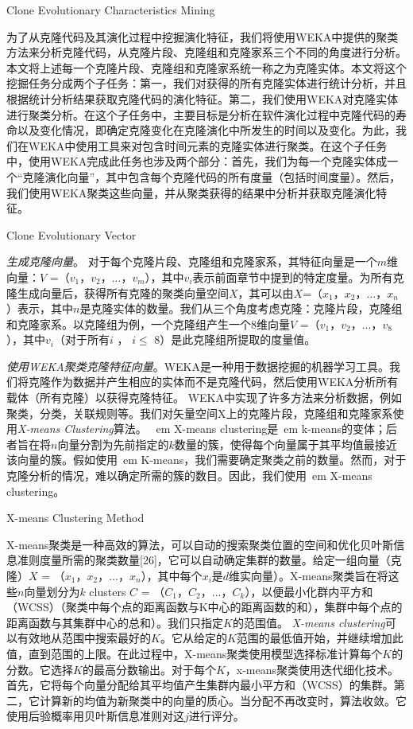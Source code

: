 {Clone Evolutionary Characteristics Mining}

为了从克隆代码及其演化过程中挖掘演化特征，我们将使用WEKA\cite{}中提供的聚类方法来分析克隆代码，从克隆片段、克隆组和克隆家系三个不同的角度进行分析。本文将上述每一个克隆片段、克隆组和克隆家系统一称之为克隆实体。本文将这个挖掘任务分成两个子任务：第一，我们对获得的所有克隆实体进行统计分析，并且根据统计分析结果获取克隆代码的演化特征。第二，我们使用WEKA对克隆实体进行聚类分析。在这个子任务中，主要目标是分析在软件演化过程中克隆代码的寿命以及变化情况，即确定克隆变化在克隆演化中所发生的时间以及变化。为此，我们在WEKA中使用工具来对包含时间元素的克隆实体进行聚类。在这个子任务中，使用WEKA完成此任务也涉及两个部分：首先，我们为每一个克隆实体成一个“克隆演化向量”，其中包含每个克隆代码的所有度量（包括时间度量）。然后，我们使用WEKA聚类这些向量，并从聚类获得的结果中分析并获取克隆演化特征。

{Clone Evolutionary Vector}

 \emph{生成克隆向量}。 对于每个克隆片段、克隆组和克隆家系，其特征向量是一个$m$维向量：{$V$ ={（$v_1$，$v_2$，$...$，$v_m$）}}，其中$v_i$表示前面章节中提到的特定度量。为所有克隆生成向量后，获得所有克隆的聚类向量空间$X$，其可以由{$X$={（$x_1$，$x_2$，$...$，$x_n$）}}表示，其中$n$是克隆实体的数量。我们从三个角度考虑克隆：克隆片段，克隆组和克隆家系。以克隆组为例，一个克隆组产生一个8维向量{$V$ =（$v_1$，$v_2$，$...$，$v_8$）}，其中$v_i$（对于所有$i$ ， $i \leq $ 8）是此克隆组所提取的度量值。
  
 \emph{ 使用WEKA聚类克隆特征向量}。WEKA是一种用于数据挖掘的机器学习工具。我们将克隆作为数据并产生相应的实体而不是克隆代码，然后使用WEKA分析所有载体（所有克隆）以获得克隆特征。 WEKA中实现了许多方法来分析数据，例如聚类，分类，关联规则等。我们对矢量空间X上的克隆片段，克隆组和克隆家系使用{\em X-means Clustering}算法。 {\ em X-means clustering}是{\ em k-means}的变体；后者旨在将$ n $向量分割为先前指定的$ k $数量的簇，使得每个向量属于其平均值最接近该向量的簇。假如使用{\ em K-means}，我们需要确定聚类之前的数量。然而，对于克隆分析的情况，难以确定所需的簇的数目。因此，我们使用{\ em X-means clustering}。

{X-means Clustering Method}

X-means聚类是一种高效的算法，可以自动的搜索聚类位置的空间和优化贝叶斯信息准则度量所需的聚类数量\cite{}[26]，它可以自动确定集群的数量。给定一组向量（克隆）$X$ = {（$x_1$，$x_2$，$...$，$x_n$）}，其中每个$x_i$是$d$维实向量）。X-means聚类旨在将这些$n$向量划分为$k$ clusters $C$ = {（$C_1$，$C_2$，$...$，$C_k$）}，以便最小化群内平方和（WCSS）（聚类中每个点的距离函数与K中心的距离函数的和），集群中每个点的距离函数与其集群中心的总和）。我们只指定$ K $的范围值。 {\em X-means clustering}可以有效地从范围中搜索最好的$K$。它从给定的$K$范围的最低值开始，并继续增加此值，直到范围的上限。在此过程中，X-means聚类使用模型选择标准计算每个$K$的分数。它选择$K$的最高分数输出。对于每个$K$，x-means聚类使用迭代细化技术。首先，它将每个向量分配给其平均值产生集群内最小平方和（WCSS）的集群。第二，它计算新的均值为新聚类中的向量的质心。当分配不再改变时，算法收敛。它使用后验概率用贝叶斯信息准则对这$j$进行评分。

